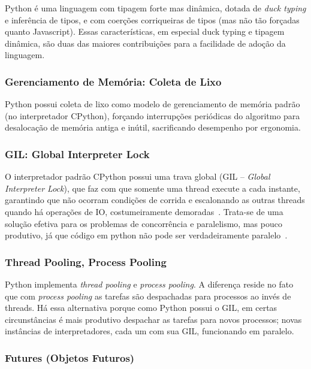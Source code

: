 \documentclass{article}
\begin{document}
Python é uma linguagem com tipagem forte mas dinâmica, dotada de \emph{duck typing} e inferência de tipos, e com coerções corriqueiras de tipos (mas não tão forçadas quanto Javascript). Essas características, em especial duck typing e tipagem dinâmica, são duas das maiores contribuições para a facilidade de adoção da linguagem.

\subsubsection{Gerenciamento de Memória: Coleta de Lixo}
\label{sssec:python memoria}

Python possui coleta de lixo como modelo de gerenciamento de memória padrão (no interpretador CPython), forçando interrupções periódicas do algoritmo para desalocação de memória antiga e inútil, sacrificando desempenho por ergonomia.

\subsubsection{GIL: Global Interpreter Lock}
\label{sssec:python gil}

O interpretador padrão CPython possui uma trava global (GIL -- {\it Global Interpreter Lock}), que faz com que somente uma thread execute a cada instante, garantindo que não ocorram condições de corrida e escalonando as outras threads quando há operações de IO, costumeiramente demoradas~\cite{lutz2001programming}. Trata-se de uma solução efetiva para os problemas de concorrência e paralelismo, mas pouco produtivo, já que código em python não pode ser verdadeiramente paralelo~\cite{lutz2001programming}.

\subsubsection{Thread Pooling, Process Pooling}
\label{sssec:python thread pooling}

Python implementa \emph{thread pooling} e \emph{process pooling}. A diferença reside no fato que com \emph{process pooling} as tarefas são despachadas para processos ao invés de threads. Há essa alternativa porque como Python possui o GIL, em certas circunstâncias é mais produtivo despachar as tarefas para novos processos; novas instâncias de interpretadores, cada um com sua GIL, funcionando em paralelo.

\subsubsection{Futures (Objetos Futuros)}
\label{sssec:python futures}
\end{document}
